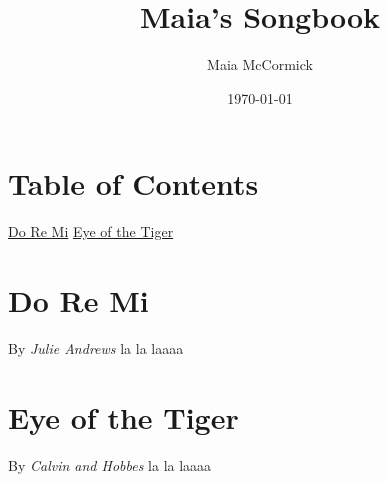 \documentclass{article}%
\title{Maia's Songbook}%
\author{Maia McCormick}%
\date{\today}%
\begin{document}
%
\normalsize%
\maketitle%
\section{Table of Contents}%
\hyperref[doremi]{Do Re Mi}%
\newline%
\hyperref[eyeofthetiger]{Eye of the Tiger}%
\newline

%
\newpage%
\section{Do Re Mi}%
\label{doremi}%
By%
\textit{Julie Andrews}%
\newline%
la la laaaa

%
\section{Eye of the Tiger}%
\label{eyeofthetiger}%
By%
\textit{Calvin and Hobbes}%
\newline%
la la laaaa

%
\end{document}
